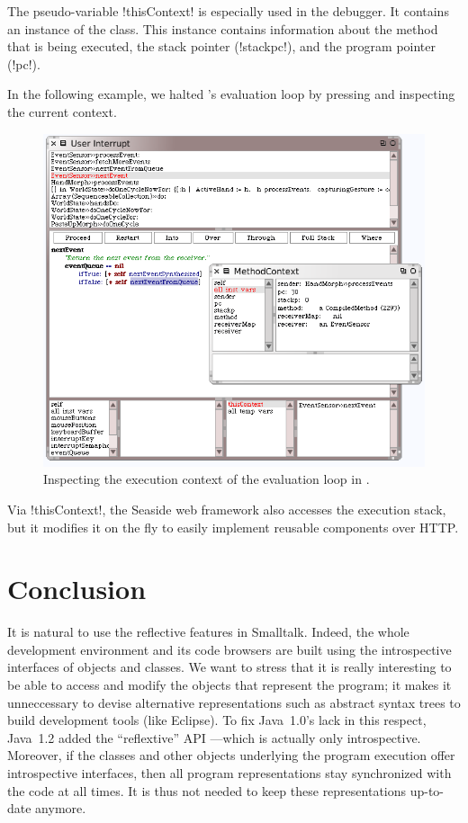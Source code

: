 \documentclass[a4paper,10pt,twoside]{book}
\begin{document}
The pseudo-variable \ct!thisContext! is especially used in the \sq debugger.
It contains an instance of the  class.
This instance contains information about the method that is being executed, the stack pointer (\ct!stackpc!), and the program pointer (\ct!pc!).

In the following example, we halted \sq's evaluation loop by pressing  and inspecting the current context.

\begin{figure}[ht]\centering
	\includegraphics[width=\linewidth]{MethodContext}
	\caption{Inspecting the execution context of the evaluation loop in \sq.\label{fig:MethodContext}}
\end{figure}

Via \ct!thisContext!, the Seaside web framework also accesses the execution stack, but it modifies it on the fly to easily implement reusable components over HTTP.



\section{Conclusion}

It is natural to use the reflective features in Smalltalk.
Indeed, the whole development environment and its code browsers are built using the introspective interfaces of objects and classes.
We want to stress that it is really interesting to be able to access and modify the objects that represent the program; it makes it unneccessary to devise alternative representations such as abstract syntax trees to build development tools (like Eclipse).
To fix Java~1.0's lack in this respect, Java~1.2 added the ``reflextive'' API ---which is actually only introspective.
Moreover, if the classes and other objects underlying the program execution offer introspective interfaces, then all program representations stay synchronized with the code at all times.
It is thus not needed to keep these representations up-to-date anymore.



\ifx\wholebook\relax\else
\end{document}
